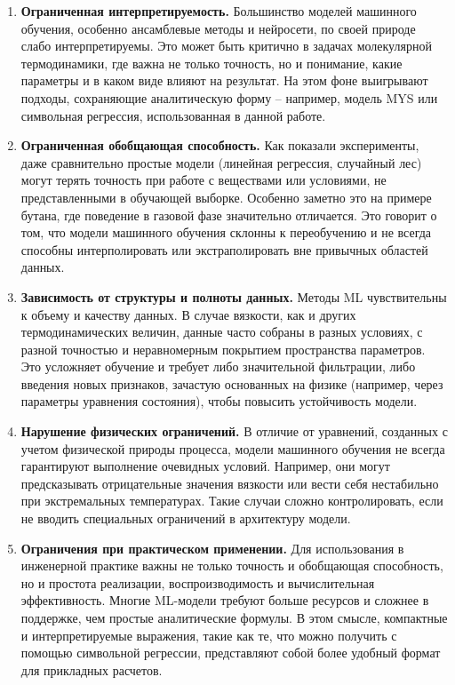 \documentclass[a4paper,12pt]{article}
\begin{document}
      \begin{enumerate}
        \item \textbf{Ограниченная интерпретируемость.}
        Большинство моделей машинного обучения, особенно ансамблевые методы и нейросети, по своей природе слабо интерпретируемы. Это может быть критично в задачах молекулярной термодинамики, где важна не только точность, но и понимание, какие параметры и в каком виде влияют на результат. На этом фоне выигрывают подходы, сохраняющие аналитическую форму -- например, модель MYS или символьная регрессия, использованная в данной работе.
        
        \item \textbf{Ограниченная обобщающая способность.}
        Как показали эксперименты, даже сравнительно простые модели (линейная регрессия, случайный лес) могут терять точность при работе с веществами или условиями, не представленными в обучающей выборке. Особенно заметно это на примере бутана, где поведение в газовой фазе значительно отличается. Это говорит о том, что модели машинного обучения склонны к переобучению и не всегда способны интерполировать или экстраполировать вне привычных областей данных.
        
        \item \textbf{Зависимость от структуры и полноты данных.}
        Методы ML чувствительны к объему и качеству данных. В случае вязкости, как и других термодинамических величин, данные часто собраны в разных условиях, с разной точностью и неравномерным покрытием пространства параметров. Это усложняет обучение и требует либо значительной фильтрации, либо введения новых признаков, зачастую основанных на физике (например, через параметры уравнения состояния), чтобы повысить устойчивость модели.
        
        \item \textbf{Нарушение физических ограничений.}
        В отличие от уравнений, созданных с учетом физической природы процесса, модели машинного обучения не всегда гарантируют выполнение очевидных условий. Например, они могут предсказывать отрицательные значения вязкости или вести себя нестабильно при экстремальных температурах. Такие случаи сложно контролировать, если не вводить специальных ограничений в архитектуру модели.
        
        \item \textbf{Ограничения при практическом применении.}
        Для использования в инженерной практике важны не только точность и обобщающая способность, но и простота реализации, воспроизводимость и вычислительная эффективность. Многие ML-модели требуют больше ресурсов и сложнее в поддержке, чем простые аналитические формулы. В этом смысле, компактные и интерпретируемые выражения, такие как те, что можно получить с помощью символьной регрессии, представляют собой более удобный формат для прикладных расчетов.

      \end{enumerate}
\end{document}
